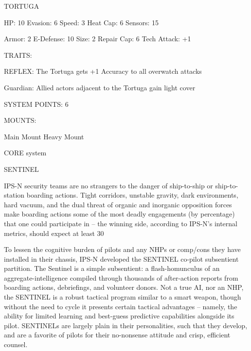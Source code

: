                                                  TORTUGA 

  HP: 10         Evasion: 6                            Speed: 3           Heat Cap: 6        Sensors: 15 

  Armor: 2       E-Defense: 10                         Size: 2            Repair Cap: 6      Tech Attack:  
                                                                                             +1 

                                                   TRAITS: 

  REFLEX: The Tortuga gets +1 Accuracy to all overwatch attacks
 
  Guardian: Allied actors adjacent to the Tortuga gain light cover  

                                             SYSTEM POINTS: 6 

                                                   MOUNTS: 

  Main Mount                        Heavy Mount 

                                                CORE system 

                                                                                                            


                                                         SENTINEL
 

  IPS-N security teams are no strangers to the danger of ship-to-ship or ship-to-station boarding actions.  
   Tight corridors, unstable gravity, dark environments, hard vacuum, and the dual threat of organic and  
  inorganic opposition forces make boarding actions some of the most deadly engagements (by  
  percentage) that one could participate in -- the winning side, according to IPS-N’s internal metrics,  
  should expect at least 30%

   To lessen the cognitive burden of pilots and any NHPs or comp/cons they have installed in their chassis,  
  IPS-N developed the SENTINEL co-pilot subsentient partition. The Sentinel is a simple subsentient: a  
  flash-homunculus of an aggregate-intelligence compiled through thousands of after-action reports from  
  boarding actions, debriefings, and volunteer donors. Not a true AI, nor an NHP, the SENTINEL is a  
  robust tactical program similar to a smart weapon, though without the need to cycle it presents certain  
  tactical advantages -- namely, the ability for limited learning and best-guess predictive capabilities  
  alongside its pilot. SENTINELs are largely plain in their personalities, such that they develop, and are a  
  favorite of pilots for their no-nonsense attitude and crisp, efficient counsel.   

